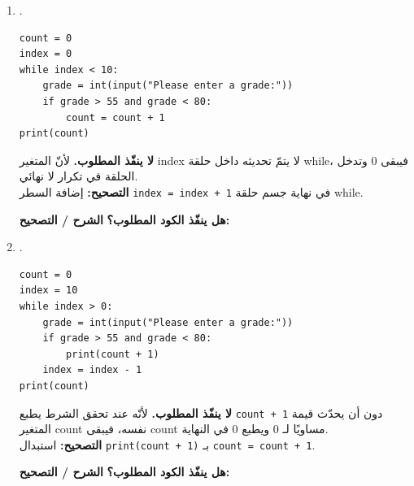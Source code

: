 \documentclass[14pt]{extarticle}
\begin{document}
\begin{enumerate}[label=\textbf{السؤال \arabic*:}, wide=0pt, itemsep=2.2em]
\begin{enumerate}[label=\textbf{مقطع \alph*:}, wide=0pt, itemsep=1.5em]
\item .
\begin{boxCode}
\begin{english}
\begin{verbatim}
count = 0
index = 0
while index < 10:
    grade = int(input("Please enter a grade:"))
    if grade > 55 and grade < 80:
        count = count + 1
print(count)
\end{verbatim}
\end{english}
\end{boxCode}
\ifwithsols
\begin{boxSolution}
\textbf{لا ينفّذ المطلوب.} لأنّ المتغير \textenglish{index} لا يتمّ تحديثه داخل حلقة \textenglish{while}، فيبقى $0$ وتدخل الحلقة في تكرار لا نهائي. \\
\textbf{التصحيح:} إضافة السطر \textenglish{\texttt{index = index + 1}} في نهاية جسم حلقة \textenglish{while}.
\end{boxSolution}
\else
\textbf{هل ينفّذ الكود المطلوب؟} \underline{\hspace{4cm}} \quad \textbf{الشرح / التصحيح:} \underline{\hspace{6cm}}
\fi
\filbreak

\item .
\begin{boxCode}
\begin{english}
\begin{verbatim}
count = 0
index = 10
while index > 0:
    grade = int(input("Please enter a grade:"))
    if grade > 55 and grade < 80:
        print(count + 1)
    index = index - 1
print(count)
\end{verbatim}
\end{english}
\end{boxCode}
\ifwithsols
\begin{boxSolution}
\textbf{لا ينفّذ المطلوب.} لأنّه عند تحقق الشرط يطبع \textenglish{\texttt{count + 1}} دون أن يحدّث قيمة المتغير \textenglish{count} نفسه، فيبقى \textenglish{count} مساويًا لـ $0$ ويطبع $0$ في النهاية. \\
\textbf{التصحيح:} استبدال \textenglish{\texttt{print(count + 1)}} بـ \textenglish{\texttt{count = count + 1}}.
\end{boxSolution}
\else
\textbf{هل ينفّذ الكود المطلوب؟} \underline{\hspace{4cm}} \quad \textbf{الشرح / التصحيح:} \underline{\hspace{6cm}}
\fi
\filbreak

\end{enumerate}
\filbreak

\end{enumerate}
\end{document}
